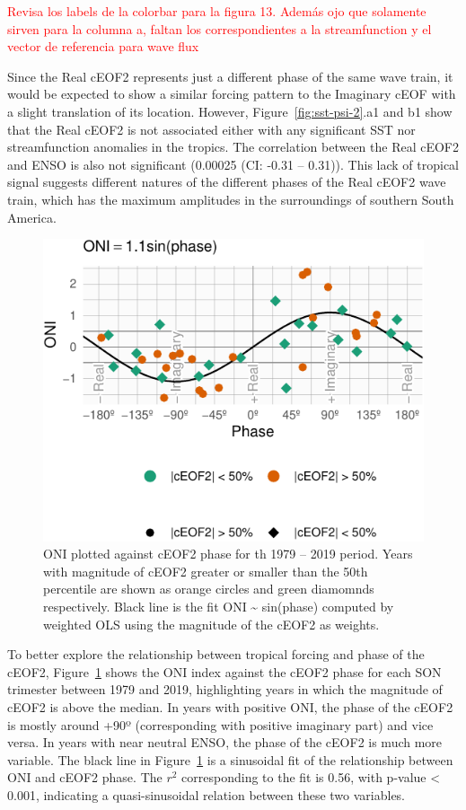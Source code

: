 \documentclass[smallextended]{svjour3}       %
\begin{document}
\textcolor{red}{Revisa los labels de la colorbar para la figura 13. Además ojo que solamente sirven para la columna a, faltan los correspondientes a la streamfunction y el vector de referencia para wave flux}

Since the Real cEOF2 represents just a different phase of the same wave train, it would be expected to show a similar forcing pattern to the Imaginary cEOF with a slight translation of its location.
However, Figure~\ref{fig:sst-psi-2}.a1 and b1 show that the Real cEOF2 is not associated either with any significant SST nor streamfunction anomalies in the tropics.
The correlation between the Real cEOF2 and ENSO is also not significant (0.00025 (CI: -0.31 -- 0.31)).
This lack of tropical signal suggests different natures of the different phases of the Real cEOF2 wave train, which has the maximum amplitudes in the surroundings of southern South America.

\begin{figure}
\centering
\includegraphics{../figures/enso-phase-1.pdf}
\caption{\label{fig:enso-phase}ONI plotted against cEOF2 phase for th 1979 -- 2019 period. Years with magnitude of cEOF2 greater or smaller than the 50th percentile are shown as orange circles and green diamomnds respectively. Black line is the fit ONI \textasciitilde{} sin(phase) computed by weighted OLS using the magnitude of the cEOF2 as weights.}
\end{figure}

To better explore the relationship between tropical forcing and phase of the cEOF2, Figure~\ref{fig:enso-phase} shows the ONI index against the cEOF2 phase for each SON trimester between 1979 and 2019, highlighting years in which the magnitude of cEOF2 is above the median.
In years with positive ONI, the phase of the cEOF2 is mostly around +90º (corresponding with positive imaginary part) and vice versa.
In years with near neutral ENSO, the phase of the cEOF2 is much more variable.
The black line in Figure~\ref{fig:enso-phase} is a sinusoidal fit of the relationship between ONI and cEOF2 phase.
The \(r^2\) corresponding to the fit is 0.56, with p-value \textless{} 0.001, indicating a quasi-sinusoidal relation between these two variables.
\end{document}
